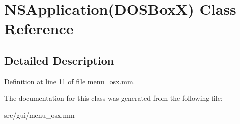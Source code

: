 \hypertarget{interfaceNSApplication_07DOSBoxX_08}{\section{N\-S\-Application(D\-O\-S\-Box\-X) Class Reference}
\label{interfaceNSApplication_07DOSBoxX_08}
}


\subsection{Detailed Description}


Definition at line 11 of file menu\-\_\-osx.\-mm.



The documentation for this class was generated from the following file\-:\begin{DoxyCompactItemize}
\item 
src/gui/menu\-\_\-osx.\-mm\end{DoxyCompactItemize}
